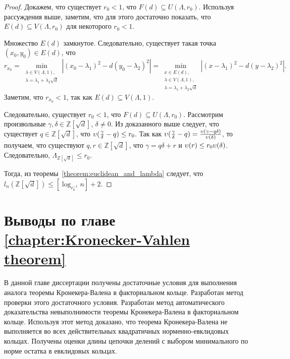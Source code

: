\documentclass[_00_dissertation.tex]{subfiles}
\begin{document}
\begin{proof}
    Докажем, что существует $r_0 < 1$, что $F(d) \subseteq U(\Lambda, r_0)$.
    Используя рассуждения выше, заметим, что для этого достаточно показать, что $E(d) \subseteq V(\Lambda, r_0)$ для некоторого $r_0 < 1$.
    
    Множество $E(d)$ замкнутое.
    Следовательно, существует такая точка $(x_0, y_0) \in E(d)$, что
    \begin{equation*}
        r_{x_0} = \min_{\substack{
            \lambda \in V(\Lambda, 1),\\
            \lambda = \lambda_1 + \lambda_2 \sqrt{d}
        }} \left|
            (x_0 - \lambda_1)^2 - d(y_0 - \lambda_2)^2
        \right| = \min_{\substack{
            x \in E(d),\\
            \lambda \in V(\Lambda, 1),\\
            \lambda = \lambda_1 + \lambda_2 \sqrt{d}
        }} \left|
            (x - \lambda_1)^2 - d(y - \lambda_2)^2
        \right|.
    \end{equation*}
    Заметим, что $r_{x_0} < 1$, так как $E(d) \subseteq V(\Lambda, 1)$.

    Следовательно, существует $r_0 < 1$, что $F(d) \subseteq U(\Lambda, r_0)$.
    Рассмотрим произвольные $\gamma, \delta \in \mathbb{Z}[\sqrt{d}]$, $\delta \neq 0$.
    Из доказанного выше следует, что существует $q \in \mathbb{Z}[\sqrt{d}]$, что $\upsilon(\frac{\gamma}{\delta} - q) \le r_0$.
    Так как $\upsilon(\frac{\gamma}{\delta} - q) = \frac{\upsilon(\gamma - q\delta)}{\upsilon(\delta)}$, то получаем, что существуют $q, r \in \mathbb{Z}[\sqrt{d}]$, что $\gamma = q\delta + r$ и $\upsilon(r) \le r_0 \upsilon(\delta)$.
    Следовательно, $\Lambda_{\mathbb{Z}[\sqrt{d}]} \le r_0$.

    Тогда, из теоремы~\ref{theorem:euclidean_and_lambda} следует, что $l_n(\mathbb{Z}[\sqrt{d}]) \le [\log_{r_0^{-1}} n] + 2$.
\end{proof}

\section*{Выводы по главе \ref{chapter:Kronecker-Vahlen theorem}}

В данной главе диссертации получены достаточные условия для выполнения аналога теоремы Кронекера-Валена в факториальном кольце.
Разработан метод проверки этого достаточного условия.
Разработан метод автоматического доказательства невыполнимости теоремы Кронекера-Валена в факториальном кольце.
Используя этот метод доказано, что теорема Кронекера-Валена не выполняется во всех действительных квадратичных норменно-евклидовых кольцах.
Получены оценки длины цепочки делений с выбором минимального по норме остатка в евклидовых кольцах.

\onlyinsubfile{
    
}
\end{document}
